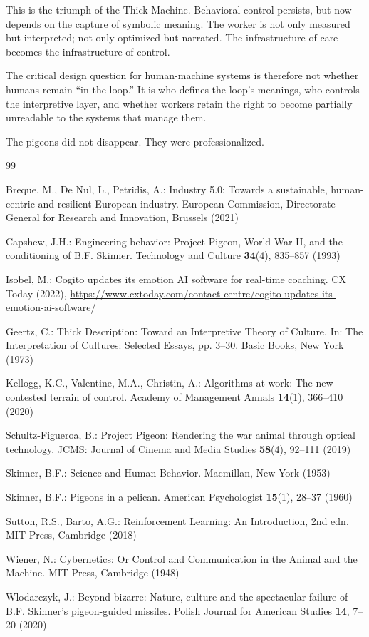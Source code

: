 \documentclass[runningheads]{llncs}
\begin{document}
This is the triumph of the Thick Machine. Behavioral control persists, but now depends on the capture of symbolic meaning. The worker is not only measured but interpreted; not only optimized but narrated. The infrastructure of care becomes the infrastructure of control.

The critical design question for human-machine systems is therefore not whether humans remain ``in the loop.'' It is who defines the loop's meanings, who controls the interpretive layer, and whether workers retain the right to become partially unreadable to the systems that manage them.

The pigeons did not disappear. They were professionalized.

\begin{thebibliography}{99}

Breque, M., De Nul, L., Petridis, A.: Industry 5.0: Towards a sustainable, human-centric and resilient European industry. European Commission, Directorate-General for Research and Innovation, Brussels (2021)

Capshew, J.H.: Engineering behavior: Project Pigeon, World War II, and the conditioning of B.F. Skinner. Technology and Culture \textbf{34}(4), 835--857 (1993)

Isobel, M.: Cogito updates its emotion AI software for real-time coaching. CX Today (2022), \url{https://www.cxtoday.com/contact-centre/cogito-updates-its-emotion-ai-software/}

Geertz, C.: Thick Description: Toward an Interpretive Theory of Culture. In: The Interpretation of Cultures: Selected Essays, pp. 3--30. Basic Books, New York (1973)

Kellogg, K.C., Valentine, M.A., Christin, A.: Algorithms at work: The new contested terrain of control. Academy of Management Annals \textbf{14}(1), 366--410 (2020)

Schultz-Figueroa, B.: Project Pigeon: Rendering the war animal through optical technology. JCMS: Journal of Cinema and Media Studies \textbf{58}(4), 92--111 (2019)

Skinner, B.F.: Science and Human Behavior. Macmillan, New York (1953)

Skinner, B.F.: Pigeons in a pelican. American Psychologist \textbf{15}(1), 28--37 (1960)

Sutton, R.S., Barto, A.G.: Reinforcement Learning: An Introduction, 2nd edn. MIT Press, Cambridge (2018)

Wiener, N.: Cybernetics: Or Control and Communication in the Animal and the Machine. MIT Press, Cambridge (1948)

Wlodarczyk, J.: Beyond bizarre: Nature, culture and the spectacular failure of B.F. Skinner's pigeon-guided missiles. Polish Journal for American Studies \textbf{14}, 7--20 (2020)

\end{thebibliography}
\end{document}
